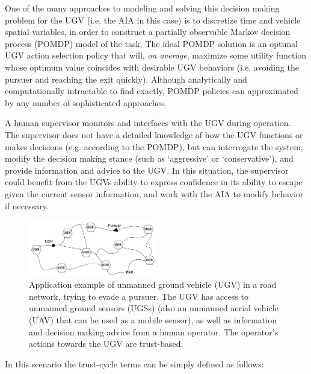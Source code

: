 One of the many approaches to modeling and solving this decision making problem for the UGV (i.e. the AIA in this case) is to discretize time and vehicle spatial variables, in order to construct a partially observable Markov decision process (POMDP) model of the task. 
The ideal POMDP solution is an optimal UGV action selection policy that will, \emph{on average}, maximize some utility function whose optimum value coincides with desirable UGV behaviors (i.e. avoiding the pursuer and reaching the exit quickly). 
Although analytically and computationally intractable to find exactly, POMDP policies can approximated by any number of sophisticated approaches.

    A human supervisor monitors and interfaces with the UGV during operation. The supervisor does not have a detailed knowledge of how the UGV functions or makes decisions (e.g. according to the POMDP), but can interrogate the system, modify the decision making stance (such as `aggressive' or `conservative'), and provide information and advice to the UGV. In this situation, the supervisor could benefit from the UGVs ability to express confidence in its ability to escape given the current sensor information, and work with the AIA to modify behavior if necessary. 
    
	\begin{figure}[htbp]
    	\centering
     	\includegraphics[width=0.5\textwidth]{Figures/RoadNet}
    	\caption{Application example of unmanned ground vehicle (UGV) in a road network, trying to evade a pursuer. The UGV has access to unmanned ground sensors (UGSs) (also an unmanned aerial vehicle (UAV) that can be used as a mobile sensor), as well as information and decision making advice from a human operator. The operator's actions towards the UGV are trust-based.}
        \label{fig:RoadNet}
    \end{figure}

    In this scenario the trust-cycle terms can be simply defined as follows:

